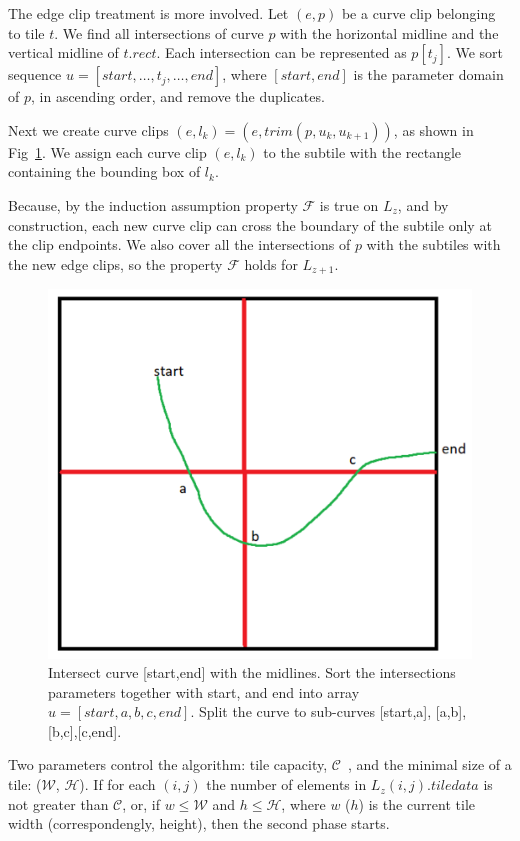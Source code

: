 \documentclass{gd-llncs}
\newcommand{\capac}{$\mathcal{C}$}
\newcommand{\mw}{$\mathcal{W}$}
\newcommand{\mh}{$\mathcal{H}$}
\begin{document}
{The edge clip treatment is more involved. Let $(e, p)$ be a curve clip belonging to tile $t$. We find all intersections of curve $p$ with the horizontal midline and the vertical midline of $t.\textit{rect}$. Each intersection can be represented as $p[t_j]$. We sort sequence $u =[start, \dots, t_j, \dots, end]$, where $[start,end]$ is the parameter domain of $p$, in ascending order, and remove the duplicates.

Next we create curve clips $(e, l_k)=(e, \textit{trim}(p, u_k, u_{k+1}))$, as shown in Fig~\ref{fig:clip}. We assign each curve clip $(e,l_k)$ to the subtile with the rectangle containing the bounding box of $l_k$.

Because, by the induction assumption property $\mathcal{F}$ is true on $L_z$, and by construction, each new curve clip can cross the boundary of the subtile only at the clip endpoints. We also cover all the intersections of $p$ with the subtiles with the new edge clips, so the property $\mathcal{F}$ holds for $L_{z+1}$.
\begin{figure}[!tbp]
  \centering
  \includegraphics[width=\textwidth/2]{./edge_clips.png}
  \caption{Intersect curve [start,end] with the midlines.
  Sort the intersections parameters together with start, and end into array $u = [start, a,b,c, end]$. Split the curve to sub-curves [start,a], [a,b],[b,c],[c,end].}
  \label{fig:clip}
\end{figure}

Two parameters control the algorithm: tile capacity, \capac~, and the minimal size of a tile: (\mw, \mh).
If for each $(i,j)$ the number of elements in $L_z(i,j).\textit{tiledata}$ is not greater than \capac, or, if $w \leq \mathcal{W}$ and $h \leq \mathcal{H}$, where $w$ ($h$) is the current tile width (correspondengly, height), then the second phase starts.

}
\end{document}
